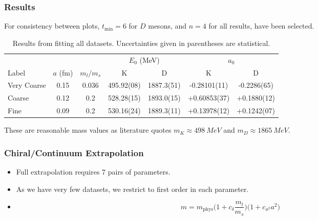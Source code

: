 \documentclass{beamer}
\begin{document}
\begin{frame}
    \frametitle{Results}
    For consistency between plots, $t_\mathrm{min}=6$ for $D$ mesons, and $n=4$ for all results, have been selected.
    \begin{table}
    \centering
    \tiny
    \begin{tabular}{l S[table-format=1.2] S[table-format=1.3] S[table-format=3.5] S[table-format=4.4] S[table-format=3.7,retain-explicit-plus] S[table-format=3.7,retain-explicit-plus]}
        \toprule
                    &                   &                   &        & \\
        \cmidrule(lr){4-5}\cmidrule(lr){6-7}
        Label       & {$a$ (\si{fm})}   & {$m_l / m_s$}     & {K}               & {D}               & {K}                & {D}\\
        \midrule
        Very Coarse & 0.15              & 0.036             & 495.92(08)        & 1887.3(51)        & -0.28101(11)       & -0.2286(65)\\
        Coarse      & 0.12              & 0.2               & 528.28(15)        & 1893.0(15)        & +0.60853(37)       & +0.1880(12)\\
        Fine        & 0.09              & 0.2               & 530.16(24)        & 1889.3(11)        & +0.13978(12)       & +0.1242(07)\\
        \bottomrule
    \end{tabular}
    \normalsize
    \caption{Results from fitting all datasets. Uncertainties given in parentheses are statistical.}
    \end{table}
    These are reasonable mass values as literature\cite{zyla2020review} quotes $m_K \approx \SI{498}{MeV}$ and $m_D \approx \SI{1865}{MeV}$.
\end{frame}

\begin{frame}
    \frametitle{Chiral/Continuum Extrapolation}
    \begin{itemize}
        \item Full extrapolation\cite{chakraborty2017nonperturbative} requires 7 pairs of parameters.
        \item As we have very few datasets, we restrict to first order in each parameter. 
        \item[]
        \begin{equation*}
            m = m_\mathrm{phys} \Big(1 + c_\delta \frac{m_l}{m_s}\Big)\Big(1 + c_{a^2} a^2\Big)
        \end{equation*}
    \end{itemize}
\end{frame}
\end{document}
